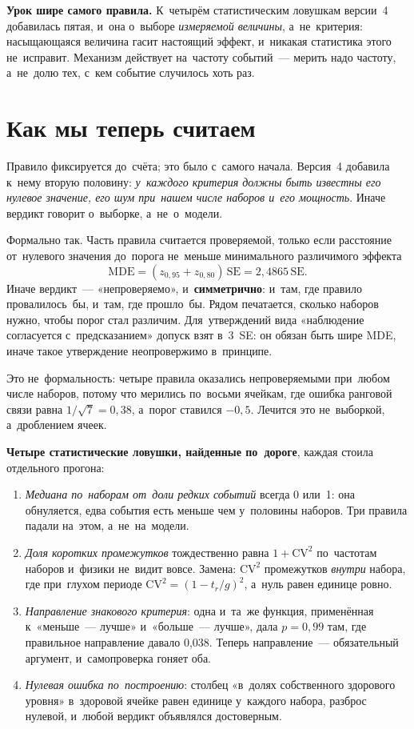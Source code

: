 \documentclass[11pt,a4paper,landscape,twocolumn]{article}
\begin{document}
\textbf{Урок шире самого правила.} К~четырём статистическим ловушкам версии~4 добавилась пятая, и~она о~выборе \emph{измеряемой величины}, а~не~критерия: насыщающаяся величина гасит настоящий эффект, и~никакая статистика этого не~исправит. Механизм действует на~частоту событий~— мерить надо частоту, а~не~долю тех, с~кем событие случилось хоть раз.

\section{Как мы теперь считаем}\label{sec:method}
Правило фиксируется до~счёта; это было с~самого начала. Версия~4 добавила к~нему вторую половину: \emph{у~каждого критерия должны быть известны его нулевое значение, его шум при~нашем числе наборов и~его мощность}. Иначе вердикт говорит о~выборке, а~не~о~модели.

Формально так. Часть правила считается проверяемой, только если расстояние от~нулевого значения до~порога не~меньше минимального различимого эффекта
\[\mathrm{MDE}=(z_{0{,}95}+z_{0{,}80})\,\mathrm{SE}=2{,}4865\,\mathrm{SE}.\]
Иначе вердикт~— «непроверяемо», и~\textbf{симметрично}: и~там, где правило провалилось~бы, и~там, где прошло~бы. Рядом печатается, сколько наборов нужно, чтобы порог стал различим. Для~утверждений вида «наблюдение согласуется с~предсказанием» допуск взят в~3~SE: он обязан быть шире MDE, иначе такое утверждение неопровержимо в~принципе.

Это не~формальность: четыре правила оказались непроверяемыми при~любом числе наборов, потому что мерились по~восьми ячейкам, где ошибка ранговой связи равна $1/\sqrt{7}=0{,}38$, а~порог ставился $-0{,}5$. Лечится это не~выборкой, а~дроблением ячеек.

\textbf{Четыре статистические ловушки, найденные по~дороге}, каждая стоила отдельного прогона:
\begin{enumerate}
\item \emph{Медиана по~наборам от~доли редких событий} всегда 0 или~1: она обнуляется, едва события есть меньше чем у~половины наборов. Три правила падали на~этом, а~не~на~модели.
\item \emph{Доля коротких промежутков} тождественно равна $1+\mathrm{CV}^2$ по~частотам наборов и~физики не~видит вовсе. Замена: $\mathrm{CV}^2$ промежутков \emph{внутри} набора, где при~глухом периоде $\mathrm{CV}^2=(1-t_r/g)^2$, а~нуль равен единице ровно.
\item \emph{Направление знакового критерия}: одна и~та~же функция, применённая к~«меньше~— лучше» и~«больше~— лучше», дала $p=0{,}99$ там, где правильное направление давало 0,038. Теперь направление~— обязательный аргумент, и~самопроверка гоняет оба.
\item \emph{Нулевая ошибка по~построению}: столбец «в~долях собственного здорового уровня» в~здоровой ячейке равен единице у~каждого набора, разброс нулевой, и~любой вердикт объявлялся достоверным.
\end{enumerate}
\end{document}
